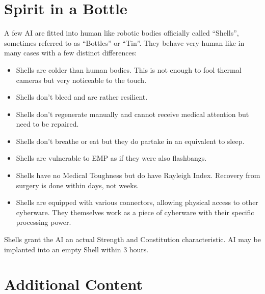 \documentclass[12pt,a4paper,openany]{book}
\begin{document}
	\chapter{Spirit in a Bottle}
	A few AI are fitted into human like robotic bodies officially called “Shells”, sometimes referred to as “Bottles” or “Tin”. They behave very human like in many cases with a few distinct differences:
	\vspace{-8mm}
	\begin{itemize}
		\setlength\itemsep{-8mm}
		\item Shells are colder than human bodies. This is not enough to fool thermal cameras but very noticeable to the touch.
		\item Shells don’t bleed and are rather resilient.
		\item Shells don’t regenerate manually and cannot receive medical attention but need to be repaired.
		\item Shells don’t breathe or eat but they do partake in an equivalent to sleep.
		\item Shells are vulnerable to EMP as if they were also flashbangs.
		\item Shells have no Medical Toughness but do have Rayleigh Index. Recovery from surgery is done within days, not weeks.
		\item Shells are equipped with various connectors, allowing physical access to other cyberware. They themselves work as a piece of cyberware with their specific processing power.
	\end{itemize}

	Shells grant the AI an actual Strength and Constitution characteristic. AI may be implanted into an empty Shell within 3 hours.

	\chapter{Additional Content}
	\vspace{-18mm}
\end{document}
